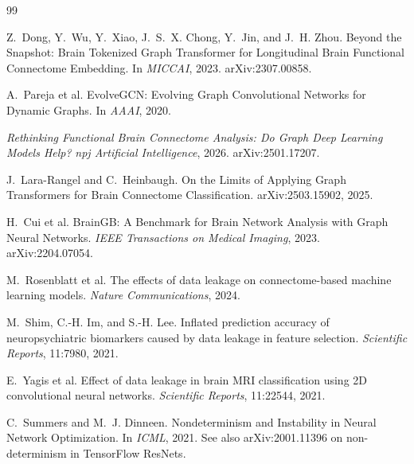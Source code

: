 \begin{thebibliography}{99}

Z.~Dong, Y.~Wu, Y.~Xiao, J.~S.~X. Chong, Y.~Jin, and J.~H. Zhou.
\newblock Beyond the Snapshot: Brain Tokenized Graph Transformer for Longitudinal Brain
  Functional Connectome Embedding.
\newblock In \emph{MICCAI}, 2023. arXiv:2307.00858.

A.~Pareja et al.
\newblock EvolveGCN: Evolving Graph Convolutional Networks for Dynamic Graphs.
\newblock In \emph{AAAI}, 2020.

\emph{Rethinking Functional Brain Connectome Analysis: Do Graph Deep Learning Models Help?}
\newblock \emph{npj Artificial Intelligence}, 2026. arXiv:2501.17207.

J.~Lara-Rangel and C.~Heinbaugh.
\newblock On the Limits of Applying Graph Transformers for Brain Connectome Classification.
\newblock arXiv:2503.15902, 2025.

H.~Cui et al.
\newblock BrainGB: A Benchmark for Brain Network Analysis with Graph Neural Networks.
\newblock \emph{IEEE Transactions on Medical Imaging}, 2023. arXiv:2204.07054.

M.~Rosenblatt et al.
\newblock The effects of data leakage on connectome-based machine learning models.
\newblock \emph{Nature Communications}, 2024.

M.~Shim, C.-H. Im, and S.-H. Lee.
\newblock Inflated prediction accuracy of neuropsychiatric biomarkers caused by data leakage
  in feature selection.
\newblock \emph{Scientific Reports}, 11:7980, 2021.

E.~Yagis et al.
\newblock Effect of data leakage in brain MRI classification using 2D convolutional neural
  networks.
\newblock \emph{Scientific Reports}, 11:22544, 2021.

C.~Summers and M.~J. Dinneen.
\newblock Nondeterminism and Instability in Neural Network Optimization.
\newblock In \emph{ICML}, 2021. See also arXiv:2001.11396 on non-determinism in TensorFlow
  ResNets.


\end{thebibliography}
